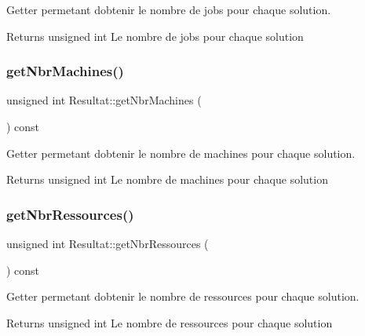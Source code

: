 Getter permetant d\textquotesingle{}obtenir le nombre de jobs pour chaque solution. 

\begin{DoxyReturn}{Returns}
unsigned int Le nombre de jobs pour chaque solution 
\end{DoxyReturn}
\mbox{\label{classResultat_a2153dfd451577fcdbd4f5bb44d531c85}} 
\subsubsection{\texorpdfstring{get\+Nbr\+Machines()}{getNbrMachines()}}
{\footnotesize\ttfamily unsigned int Resultat\+::get\+Nbr\+Machines (\begin{DoxyParamCaption}{ }\end{DoxyParamCaption}) const}



Getter permetant d\textquotesingle{}obtenir le nombre de machines pour chaque solution. 

\begin{DoxyReturn}{Returns}
unsigned int Le nombre de machines pour chaque solution 
\end{DoxyReturn}
\mbox{\label{classResultat_a27c7c950f55c5cf608a8acb6b1eb3c80}} 
\subsubsection{\texorpdfstring{get\+Nbr\+Ressources()}{getNbrRessources()}}
{\footnotesize\ttfamily unsigned int Resultat\+::get\+Nbr\+Ressources (\begin{DoxyParamCaption}{ }\end{DoxyParamCaption}) const}



Getter permetant d\textquotesingle{}obtenir le nombre de ressources pour chaque solution. 

\begin{DoxyReturn}{Returns}
unsigned int Le nombre de ressources pour chaque solution 
\end{DoxyReturn}
\mbox{\label{classResultat_ac1b23e9ca052ec68a71f7d028673404c}} 

